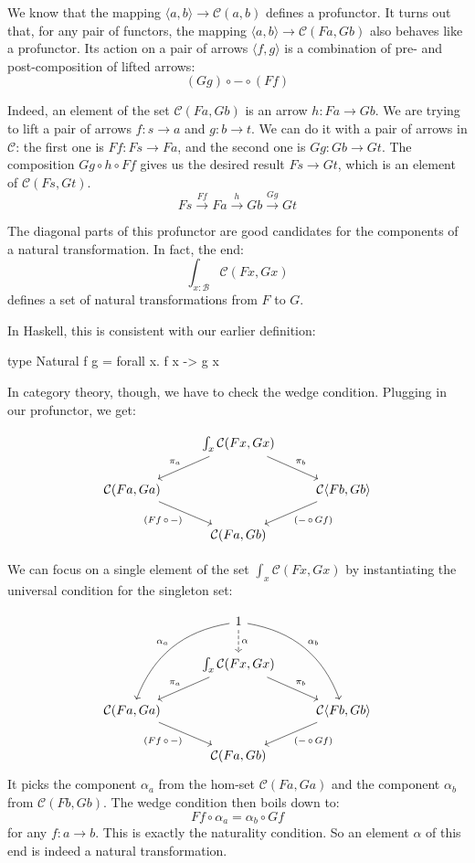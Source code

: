 \documentclass[DaoFP]{subfiles}
\begin{document}
We know that the mapping $\langle a, b \rangle \to \mathcal{C} (a, b)$ defines a profunctor.  It turns out that, for any pair of functors, the mapping  $\langle a, b \rangle \to \mathcal{C} (F a, G b)$ also behaves like a profunctor. Its action on a pair of arrows $\langle f, g \rangle$ is a combination of pre- and post-composition of lifted arrows:
 \[ (G g) \circ - \circ (F f) \]

Indeed, an element of the set $ \mathcal{C} (F a, G b)$ is an arrow $h \colon F a \to G b$. We are trying to lift a pair of arrows $f \colon s \to a$ and $g \colon b \to t$. We can do it with a pair of arrows in $\mathcal{C}$: the first one is $F f \colon F s \to F a$, and the second one is $G g \colon G b \to G t$. The composition $G g \circ h \circ F f$ gives us the desired result $ F s \to G t$, which is an element of $\mathcal{C} (F s, G t)$.
\[ F s \xrightarrow{F f} F a \xrightarrow{h} G b \xrightarrow{G g} G t \]

The diagonal parts of this profunctor are good candidates for the components of a natural transformation. In fact, the end:
\[  \int_{x \colon  \mathcal{B}} \mathcal{C}(F x, G x) \]
defines a set of natural transformations from $F$ to $G$.

In Haskell, this is consistent with our earlier definition:
\begin{haskell}
type Natural f g = forall x. f x -> g x
\end{haskell}

In category theory, though, we have to check the wedge condition. Plugging in our profunctor, we get:

\[
 \begin{tikzcd}
 & \int_{x} \mathcal{C}(F x, G x)
 \arrow[ld, "\pi_a"']
 \arrow[rd, "\pi_b"]
 \\
  \mathcal{C} ( F a, G a )
 \arrow[dr, "{(Ff \, \circ \, -)}"']
 && \mathcal{C} \langle F b, G b \rangle
 \arrow[dl, "{(- \, \circ\, Gf)}"]
 \\
 &  \mathcal{C} ( F a, G b )
 \end{tikzcd}
\]

We can focus on a single element of the set $\int_{x} \mathcal{C}(F x, G x)$ by instantiating the universal condition for the singleton set:

\[
 \begin{tikzcd}
 & 1
 \arrow[d, dashed, "\alpha"]
\arrow[ddl, bend right, "\alpha_a"']
 \arrow[ddr, bend left, "\alpha_b"]
 \\
 & \int_{x} \mathcal{C}(F x, G x)
 \arrow[ld, "\pi_a"']
 \arrow[rd, "\pi_b"]
 \\
  \mathcal{C} ( F a, G a )
 \arrow[dr, "{(F f \, \circ \, -)}"']
 && \mathcal{C} \langle F b, G b \rangle
 \arrow[dl, "{(- \, \circ\, G f)}"]
 \\
 &  \mathcal{C} ( F a, G b )
 \end{tikzcd}
\]
It picks the component $\alpha_a$ from the hom-set $\mathcal{C} ( F a, G a )$ and the component $\alpha_b$ from $\mathcal{C} ( F b, G b )$. The wedge condition then boils down to:
\[ F f \circ \alpha_a = \alpha_b \circ G f \]
for any $f \colon a \to b$. This is exactly the naturality condition. So an element $\alpha$ of this end is indeed a natural transformation.
\end{document}
